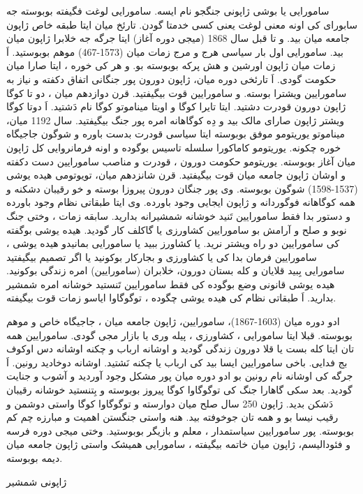 \documentclass[a4paper]{article}
\begin{document}
سامورایی یا بوشی ژاپونی جنگجو نام ایسه. سامورایی لوغت فگیفته بوبوسته جه سابورای کی اونه معنی لوغت یعنی کسی خدمتا گودن. تارئخ میان ایتا طبقه خاص ژاپون جامعه میان بید. و تا قبل سال 1868 (میجی دوره آغاز) ایتا جرگه جه خلابرا ژاپون میان بید. سامورایی اول بار سیاسی هرج و مرج زمات میان (1573-467) موهم بوبوستید. اَ زمات میان ژاپون اورشین و هش پرکه بوبوسته بو. و هر کی خوره ، ایتا صارا میان حکومت گودی. اَ تارئخی دوره میان، ژاپون دورون پور جنگانی اتفاق دکفته و نیاز به سامورایین ویشترا بوسته. و سامورایین قوت بیگیفتید. قرن دوازدهم میان ، دو تا کوگا ژاپون دورون قودرت دشتید. ایتا تایرا کوگا و اویتا میناموتو کوگا نام دَشتید. اَ دوتا کوگا ویشتر ژاپون صارای مالک بید و دِه کوگاهانه امره پور جنگ بیگیفتید. سال 1192 میان، میناموتو یوریتومو موفق بوبوسته ایتا سیاسی قودرت بدست باوره و شوگون جاجیگاه خوره چکونه. یوریتومو کاماکورا سلسله تاسیس بوگوده و اونه فرمانروایی کل ژاپون میان آغاز بوبوسته. یوریتومو حکومت دورون ، قودرت و مناصب سامورایین دست دکفته و اوشان ژاپون جامعه میان قوت بیگیفتید. قرن شانزدهم میان، تویوتومی هیده یوشی (1537-1598) شوگون بوبوسته. وی پور جنگان دورون پیروزا بوسته و خو رقیبان دشکنه و همه کوگاهانه فوگوردانه و ژاپون ایجایی وجود باورده. وی ایتا طبقاتی نظام وجود باورده و دستور بدا فقط سامورایین تَنید خوشانه شمشیرانه بدارید. سابقه زمات ، وختی جنگ نوبو و صلح و آرامش بو سامورایین کشاورزی یا گاکلف کار گودید. هیده یوشی بوگفته کی سامورایین دو راه ویشتر نرید. یا کشاورز ببید یا سامورایی بمانیدو هیده یوشی ، سامورایین فرمان بدا کی یا کشاورزی و بجارکار بوکونید یا اگر تصمیم بیگیفتید سامورایی بِبید قلایان و کله بستان دورون، خلابران (سامورایین) امره زندگی بوکونید. هیده یوشی قانونی وضع بوگوده کی فقط سامورایین تَنستید خوشانه امره شمشیر بدارید. اَ طبقاتی نظام کی هیده یوشی چگوده ، توگوگاوا ایاسو زمات قوت بیگیفته.

ادو دوره میان (1603-1867)، سامورایین، ژاپون جامعه میان ، جاجیگاه خاص و موهم بوبوسته. قبلا ایتا سامورایی ، کشاورزی ، پیله وری یا بازار مجی گودی. سامورایین همه تان ایتا کله بست یا قلا دورون زندگی گودید و اوشانه ارباب و چکنه اوشانه دس اوکوف بج فدایی. باخی سامورایین ایسا بید کی ارباب یا چکنه نَشتید. اوشانه دوخادید رونین. اَ جرگه کی اوشانه نام رونین بو ادو دوره میان پور مشکل وجود آوردید و آشوب و جنایت گودید. بعد سکی گاهارا جنگ کی توگوگاوا کوگا پیروز بوبوسته و بِتنستید خوشانه رقیبان دَشکن بدید. ژاپون 250 سال صلح میان دوارسته و توگوگاوا کوگا واستی دوشمن و رقیب نیسا بو و همه تان جوخوفته بید. هنه واستی جنگستن اهمیت و مبارزه چم کم بوبوسته. پور سامورایین سیاستمدار ، معلم و بازیگر بوبوستید. وختی میجی دوره فرسه و فئودالیسم، ژاپون میان خاتمه بیگیفته ، سامورایی همیشک واستی ژاپون جامعه میان دیمه بوبوسته.

ژاپونی شمشیر
\end{document}
